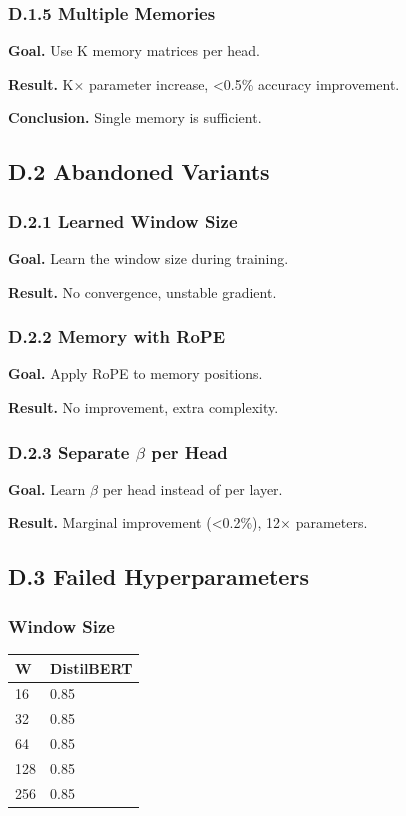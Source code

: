 \subsubsection{D.1.5 Multiple Memories}

\textbf{Goal.} Use K memory matrices per head.

\textbf{Result.} K$\times$ parameter increase, <0.5\% accuracy improvement.

\textbf{Conclusion.} Single memory is sufficient.

\subsection{D.2 Abandoned Variants}

\subsubsection{D.2.1 Learned Window Size}

\textbf{Goal.} Learn the window size during training.

\textbf{Result.} No convergence, unstable gradient.

\subsubsection{D.2.2 Memory with RoPE}

\textbf{Goal.} Apply RoPE to memory positions.

\textbf{Result.} No improvement, extra complexity.

\subsubsection{D.2.3 Separate $\beta$ per Head}

\textbf{Goal.} Learn $\beta$ per head instead of per layer.

\textbf{Result.} Marginal improvement (<0.2\%), 12$\times$ parameters.

\subsection{D.3 Failed Hyperparameters}

\subsubsection{Window Size}

\begin{table}[H]
\centering
\small
\begin{tabular}{ll}
\toprule
\textbf{W} & \textbf{DistilBERT} \\
\midrule
16 & 0.85 \\
32 & 0.85 \\
64 & 0.85 \\
128 & 0.85 \\
256 & 0.85 \\
\bottomrule
\end{tabular}
\end{table}

